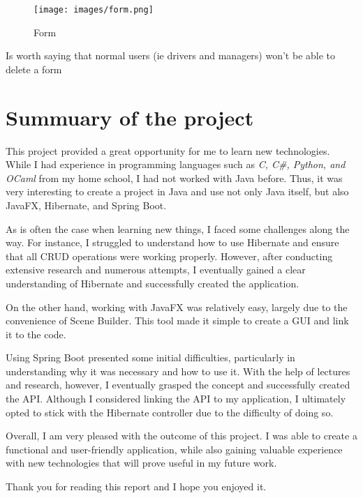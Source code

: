 \documentclass{article}
\begin{document}
\newpage
\begin{figure}[h]
    \centering
    \texttt{[image: images/form.png]}
    \caption{Form}
\end{figure}

Is worth saying that normal users (ie drivers and managers) won't be able to delete a form

\section{Summuary of the project}
This project provided a great opportunity for me to learn new technologies. While I had 
experience in programming languages such as \textit{C, C\#, Python, and OCaml} from my home school,
I had not worked with Java before. Thus, it was very interesting to create a project in Java 
and use not only Java itself, but also JavaFX, Hibernate, and Spring Boot.

As is often the case when learning new things, I faced some challenges along the way. 
For instance, I struggled to understand how to use Hibernate and ensure that all CRUD 
operations were working properly. However, after conducting extensive research and numerous 
attempts, I eventually gained a clear understanding of Hibernate and successfully created 
the application.

On the other hand, working with JavaFX was relatively easy, largely due to the convenience 
of Scene Builder. This tool made it simple to create a GUI and link it to the code.

Using Spring Boot presented some initial difficulties, particularly in understanding why 
it was necessary and how to use it. With the help of lectures and research, however, 
I eventually grasped the concept and successfully created the API. Although I considered 
linking the API to my application, I ultimately opted to stick with the Hibernate controller 
due to the difficulty of doing so.

Overall, I am very pleased with the outcome of this project. I was able to create a 
functional and user-friendly application, while also gaining valuable experience with 
new technologies that will prove useful in my future work.

Thank you for reading this report and I hope you enjoyed it.
\end{document}
